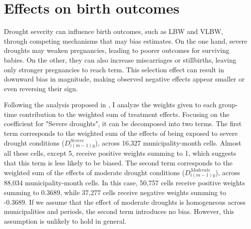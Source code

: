 \section{Effects on birth outcomes}

Drought severity can influence birth outcomes, such as LBW and VLBW, through competing mechanisms that may bias estimates. On the one hand, severe droughts may weaken pregnancies, leading to poorer outcomes for surviving babies. On the other, they can also increase miscarriages or stillbirths, leaving only stronger pregnancies to reach term. This selection effect can result in downward bias in magnitude, making observed negative effects appear smaller or even reversing their sign.



















Following the analysis proposed in \cite{deChaisemartin2023}, I analyze the weights given to each group-time contribution to the weighted sum of treatment effects. Focusing on the coefficient for "Severe droughts", it can be decomposed into two terms. The first term corresponds to the weighted sum of the effects of being exposed to severe drought conditions ($D^{Severe}_{i(m-1)y}$), across 16,327 municipality-month cells. Almost all these cells, except 5, receive positive weights summing to 1, which suggests that this term is less likely to be biased. The second term corresponds to the weighted sum of the effects of moderate drought conditions ($D^{Moderate}_{i(m-1)y}$), across 88,034 municipality-month cells. In this case, 50,757 cells receive positive weights summing to 0.3689, while 37,277 cells receive negative weights summing to -0.3689. If we assume that the effect of moderate droughts is homogeneous across municipalities and periods, the second term introduces no bias. However, this assumption is unlikely to hold in general. 

